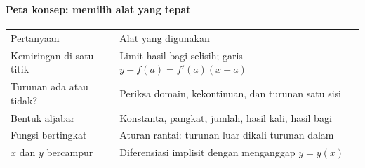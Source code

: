 \documentclass{../../kalkulus-ppt}
\renewcommand{\arraystretch}{1.5}
\begin{document}
\begin{frame}
\frametitle{\insertsection}
\framesubtitle{Peta konsep: memilih alat yang tepat}

\begin{center}
\renewcommand{\arraystretch}{1.35}
\begin{tabular}{p{}|p{}}
\rowcolor{HIMAmuda} Pertanyaan & Alat yang digunakan\\
Kemiringan di satu titik & Limit hasil bagi selisih; garis $y-f(a)=f'(a)(x-a)$\\
Turunan ada atau tidak? & Periksa domain, kekontinuan, dan turunan satu sisi\\
Bentuk aljabar & Konstanta, pangkat, jumlah, hasil kali, hasil bagi\\
Fungsi bertingkat & Aturan rantai: turunan luar dikali turunan dalam\\
$x$ dan $y$ bercampur & Diferensiasi implisit dengan menganggap $y=y(x)$
\end{tabular}
\end{center}
\end{frame}
\end{document}
